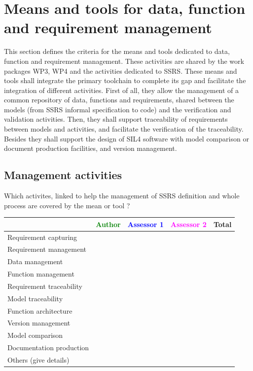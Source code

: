 \section{Means and tools for data, function and requirement management}
\label{sec:management}


This section defines the criteria for the means and tools dedicated to data, function and requirement management. These activities are shared by the work packages WP3, WP4 and the activities dedicated to  SSRS.
These means and tools shall integrate the primary toolchain to  complete its gap and facilitate the integration of different activities. First of all, they  allow the management of a common repository of data, functions and requirements, shared between the models (from SSRS informal specification to code) and the verification and validation activities.  
Then, they shall support traceability of requirements between models and activities, and facilitate the verification of the traceability.
Besides they shall support the design of SIL4 software with model comparison or document production facilities, and version management.

\subsection{Management activities}

Which activites, linked to help the management of SSRS definition and whole process are covered by the mean or tool  ?

\begin{tabular}{|l | c | c | c | c|}
\hline
& \textcolor{green}{Author} & \textcolor{blue}{Assessor 1} & \textcolor{magenta}{Assessor 2} & Total \\
\hline 
Requirement capturing & & & &  \\
\hline
Requirement management  & & & & \\
\hline
Data management & & & & \\
\hline
Function management & & & & \\
\hline
Requirement traceability  & & & & \\
\hline
Model traceability & & & & \\
\hline
Function architecture & & & & \\
\hline
Version management & & & & \\
\hline
Model comparison & & & & \\
\hline
Documentation production & & & & \\
\hline
Others (give details) & & & & \\
\hline
\end{tabular}


